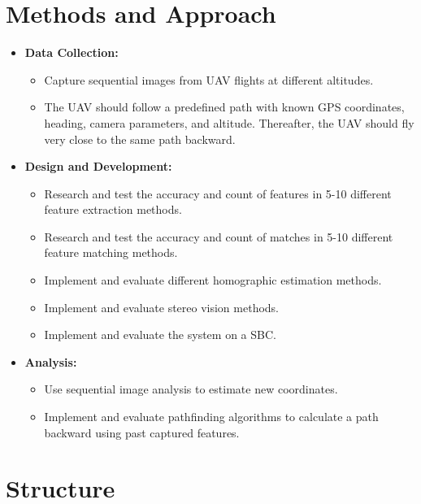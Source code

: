 \section{Methods and Approach}
\begin{itemize}
    \item \textbf{Data Collection:}
    \begin{itemize}
        \item Capture sequential images from UAV flights at different altitudes.
        \item The UAV should follow a predefined path with known GPS coordinates, heading, camera parameters, and altitude. Thereafter, the UAV should fly very close to the same path backward.
    \end{itemize}
    \item \textbf{Design and Development:}
    \begin{itemize}
        \item Research and test the accuracy and count of features in 5-10 different feature extraction methods. 
        \item Research and test the accuracy and count of matches in 5-10 different feature matching methods.
        \item Implement and evaluate different homographic estimation methods. 
        \item Implement and evaluate stereo vision methods.
        \item Implement and evaluate the system on a SBC.
    \end{itemize}
    \item \textbf{Analysis:}
    \begin{itemize}
        \item Use sequential image analysis to estimate new coordinates.
        \item Implement and evaluate pathfinding algorithms to calculate a path backward using past captured features.
    \end{itemize}
\end{itemize}

\section{Structure}

